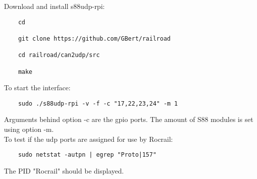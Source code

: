 Download and install s88udp-rpi:

\begin{verbatim}
	cd
	
	git clone https://github.com/GBert/railroad
	
	cd railroad/can2udp/src
	
	make
\end{verbatim}

To start the interface: 

\begin{verbatim}
	sudo ./s88udp-rpi -v -f -c "17,22,23,24" -m 1
\end{verbatim}

Arguments behind option -c are the gpio ports. The amount of S88 modules is set using option -m. \\

To test if the udp ports are assigned for use by Rocrail:

\begin{verbatim}
	sudo netstat -autpn | egrep "Proto|157"
\end{verbatim}

The PID "Rocrail" should be displayed.
